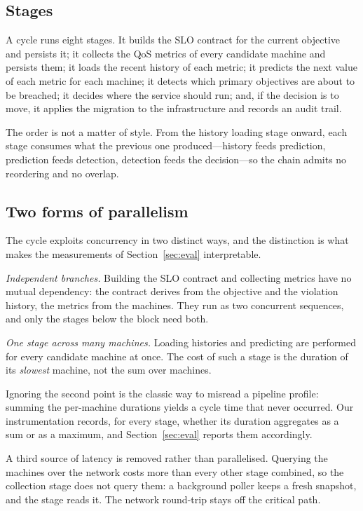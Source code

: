 \documentclass[conference]{IEEEtran}
\begin{document}
\subsection{Stages}

A cycle runs eight stages. It builds the SLO contract for the current
objective and persists it; it collects the QoS metrics of every candidate
machine and persists them; it loads the recent history of each metric;
it predicts the next value of each metric for each machine; it detects which
primary objectives are about to be breached; it decides where the service
should run; and, if the decision is to move, it applies the migration to the
infrastructure and records an audit trail.

The order is not a matter of style. From the history loading stage onward,
each stage consumes what the previous one produced---history feeds prediction,
prediction feeds detection, detection feeds the decision---so the chain admits
no reordering and no overlap.

\subsection{Two forms of parallelism}

The cycle exploits concurrency in two distinct ways, and the distinction is
what makes the measurements of Section~\ref{sec:eval} interpretable.

\emph{Independent branches.} Building the SLO contract and collecting metrics
have no mutual dependency: the contract derives from the objective and the
violation history, the metrics from the machines. They run as two concurrent
sequences, and only the stages below the block need both.

\emph{One stage across many machines.} Loading histories and predicting are
performed for every candidate machine at once. The cost of such a stage is the
duration of its \emph{slowest} machine, not the sum over machines.

Ignoring the second point is the classic way to misread a pipeline profile:
summing the per-machine durations yields a cycle time that never occurred. Our
instrumentation records, for every stage, whether its duration aggregates as a
sum or as a maximum, and Section~\ref{sec:eval} reports them accordingly.

A third source of latency is removed rather than parallelised. Querying the
machines over the network costs more than every other stage combined, so the
collection stage does not query them: a background poller keeps a fresh
snapshot, and the stage reads it. The network round-trip stays off the
critical path.
\end{document}
